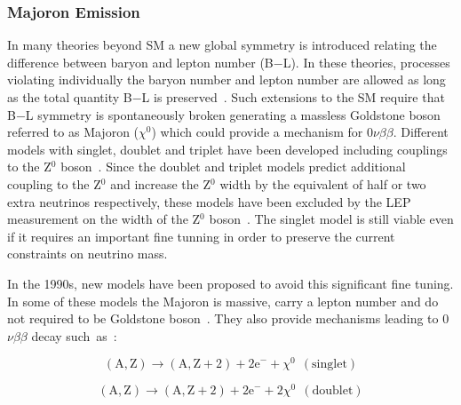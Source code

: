 \documentclass[main.tex]{subfiles}
\begin{document}
\FloatBarrier


\subsubsection{Majoron Emission}


\NI In many theories beyond SM a new global symmetry is introduced relating the difference between baryon and lepton number (B$-$L). In these theories, processes violating individually the baryon number and lepton number are allowed as long as the total quantity B$-$L is preserved~\cite{B-L-Interaction}. Such extensions to the SM require that B$-$L symmetry is spontaneously broken generating a massless Goldstone boson referred to as Majoron ($\chi^\text{0}$) which could provide a mechanism for 0$\nu\beta\beta$. Different models with singlet, doublet and triplet have been developed including couplings to the Z$^\text{0}$ boson~\cite{MajoronEmission1,MajoronEmission2,MajoronEmission3}. Since the doublet and triplet models predict additional coupling to the Z$^\text{0}$ and increase the Z$^\text{0}$ width by the equivalent of half or two extra neutrinos respectively, these models have been excluded by the LEP measurement on the width of the Z$^\text{0}$ boson~\cite{ALEPH3neutrino}. The singlet model is still viable even if it requires an important fine tunning in order to preserve the current constraints on neutrino mass.


\bigskip


\NI In the 1990s, new models have been proposed to avoid this significant fine tuning. In some of these models the Majoron is massive, carry a lepton number and do not required to be Goldstone boson~\cite{MajoronDecayMode}. They also provide mechanisms leading to 0$\nu\beta\beta$ decay such~as~:


\begin{equation}
(\text{A},\text{Z}) \rightarrow (\text{A},\text{Z}+\text{2}) + \text{2e}^- + \chi^{\text{0}}~~(\text{singlet})
\end{equation}

\begin{equation}
(\text{A},\text{Z}) \rightarrow (\text{A},\text{Z}+\text{2}) + \text{2e}^- + \text{2}\chi^{\text{0}}~~(\text{doublet})
\end{equation}


\bigskip




\end{document}
